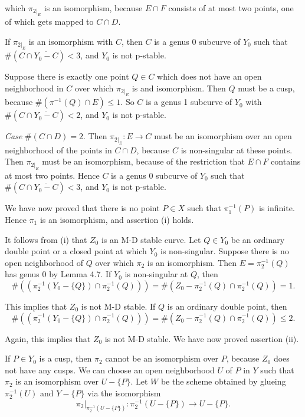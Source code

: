 \documentclass[12pt]{memoir}
\begin{document}
\begin{ptcbp}

which $\pi_{2|_E}$ is an isomorphism, because $E \cap F$ consists of at most two points, one of which gets mapped to $C \cap D$.

If $\pi_{2|_E}$ is an isomorphism with $C$, then $C$ is a genus 0 subcurve of $Y_0$ such that $\#(C \cap \overline{Y_0 - C}) < 3$, and $Y_0$ is not p-stable.

Suppose there is exactly one point $Q \in C$ which does not have an open neighborhood in $C$ over which $\pi_{2|_E}$ is and isomorphism. Then $Q$ must be a cusp, because $\#(\pi^{-1}(Q) \cap E) \leqslant 1$. So $C$ is a genus 1 subcurve of $Y_0$ with $\#(C \cap \overline{Y_0 - C}) < 2$, and $Y_0$ is not p-stable.

\emph{Case} $\#(C \cap D) = 2$. Then $\pi_{2|_E}\colon E \to C$ must be an isomorphism over an open neighborhood of the points in $C \cap D$, because $C$ is non-singular at these points. Then $\pi_{2|_E}$ must be an isomorphism, because of the restriction that $E \cap F$ contains at most two points. Hence $C$ is a genus 0 subcurve of $Y_0$ such that $\#(C \cap \overline{Y_0 - C}) < 3$, and $Y_0$ is not p-stable.

We have now proved that there is no point $P \in X$ such that $\pi_1^{-1}(P)$ is infinite. Hence $\pi_1$ is an isomorphism, and assertion (i) holds.

It follows from (i) that $Z_0$ is an M-D stable curve. Let $Q \in Y_0$ be an ordinary double point or a closed point at which $Y_0$ is non-singular. Suppose there is no open neighborhood of $Q$ over which $\pi_2$ is an isomorphism. Then $E = \pi_2^{-1}(Q)$ has genus 0 by Lemma 4.7. If $Y_0$ is non-singular at $Q$, then
\[
\#((\pi_2^{-1}(Y_0 - \{Q\}) \cap \pi_2^{-1}(Q))) = \#(Z_0 - \pi_2^{-1}(Q) \cap \pi_2^{-1}(Q)) = 1.
\]

This implies that $Z_0$ is not M-D stable. If $Q$ is an ordinary double point, then
\[
\#((\pi_2^{-1}(Y_0 - \{Q\}) \cap \pi_2^{-1}(Q))) = \#(Z_0 - \pi_2^{-1}(Q) \cap \pi_2^{-1}(Q)) \leqslant 2.
\]

Again, this implies that $Z_0$ is not M-D stable. We have now proved assertion (ii).

If $P \in Y_0$ is a cusp, then $\pi_2$ cannot be an isomorphism over $P$, because $Z_0$ does not have any cusps. We can choose an open neighborhood $U$ of $P$ in $Y$ such that $\pi_2$ is an isomorphism over $U - \{P\}$. Let $W$ be the scheme obtained by glueing $\pi_2^{-1}(U)$ and $Y - \{P\}$ via the isomorphism
\[
\pi_2|_{\pi_2^{-1}(U - \{P\})}\colon \pi_2^{-1}(U - \{P\}) \to U - \{P\}.
\]


\end{ptcbp}
\end{document}
